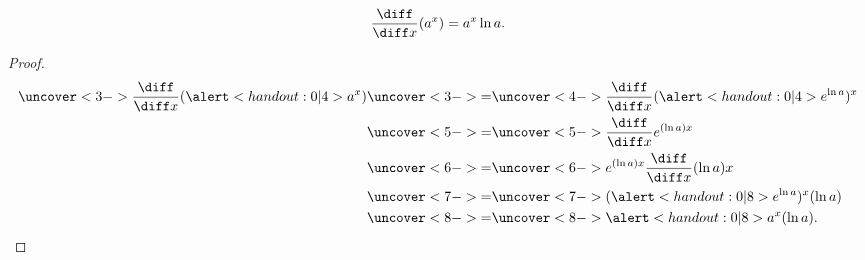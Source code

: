 \begin{frame}
\begin{theorem}
\[
\frac{\diff}{\diff x} (a^x) = a^x \ln a .
\]
\end{theorem}
\begin{proof}
\abovedisplayskip=0pt
\belowdisplayskip=0pt
\abovedisplayshortskip=0pt
\belowdisplayshortskip=0pt
\begin{align*}
\uncover<3->{\frac{\diff}{\diff x} (\alert<handout:0| 4>{a^x})}%
& \uncover<3->{ = }  %
\uncover<4->{\frac{\diff}{\diff x} (\alert<handout:0| 4>{e^{\ln a}})^x}\\%
& \uncover<5->{ = }  %
\uncover<5->{\frac{\diff}{\diff x} e^{(\ln a)x}}\\%
& \uncover<6->{ = }  %
\uncover<6->{ e^{(\ln a)x}\frac{\diff}{\diff x}(\ln a)x }\\%
& \uncover<7->{ = }  %
\uncover<7->{ (\alert<handout:0| 8>{e^{\ln a}})^x(\ln a) }\\%
& \uncover<8->{ = }  %
\uncover<8->{ \alert<handout:0| 8>{a}^x(\ln a).}%
\end{align*}
\end{proof}
\end{frame}

